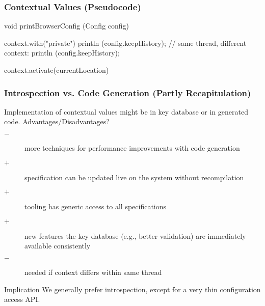 \begin{frame}[fragile]
	\frametitle{Contextual Values (Pseudocode)}

	\begin{code}[gobble=4,language=C++,morekeywords={context}]
	void printBrowserConfig (Config config)
	{
		context.with("private")
		{
			println (config.keepHistory);
		}
		// same thread, different context:
		println (config.keepHistory);

		context.activate(currentLocation)
	}
	\end{code}
\end{frame}
\begin{frame}
	\frametitle{Introspection vs. Code Generation (Partly Recapitulation)}

	Implementation of contextual values might be in key database or in generated code.
	Advantages/Disadvantages?

	\pause

	\begin{description} %
	\item[$-$] more techniques for performance improvements with code generation
	\item[$+$] specification can be updated live on the system without recompilation
	\item[$+$] tooling has generic access to all specifications
 	\item[$+$] new features the key database (e.g., better validation) are immediately available consistently
	\item[$-$] \color{red} needed if context differs within same thread
	\end{description}

	\vspace{0.5em}

	\begin{alertblock}{Implication}
	We generally prefer introspection, except for a very thin configuration access API.
	\end{alertblock}
\end{frame}


